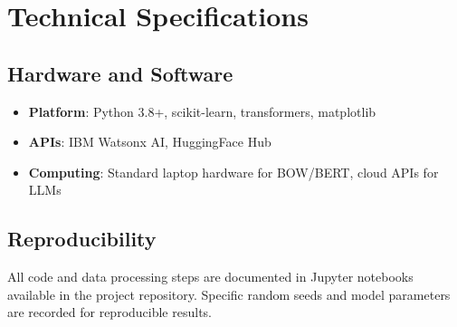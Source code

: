 \documentclass[12pt,a4paper]{article}
\begin{document}
\appendix

\section{Technical Specifications}
\subsection{Hardware and Software}
\begin{itemize}
    \item \textbf{Platform}: Python 3.8+, scikit-learn, transformers, matplotlib
    \item \textbf{APIs}: IBM Watsonx AI, HuggingFace Hub
    \item \textbf{Computing}: Standard laptop hardware for BOW/BERT, cloud APIs for LLMs
\end{itemize}

\subsection{Reproducibility}
All code and data processing steps are documented in Jupyter notebooks available in the project repository. Specific random seeds and model parameters are recorded for reproducible results.
\end{document}
